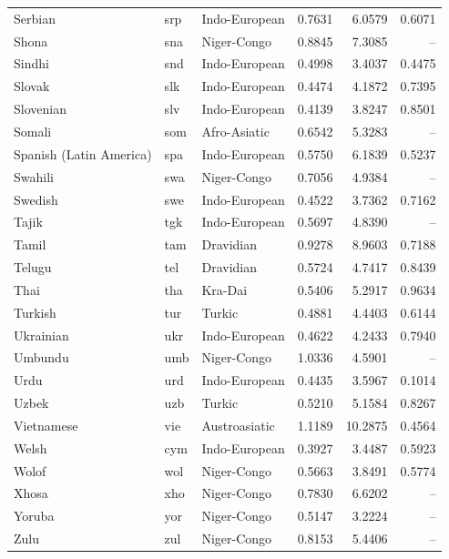 \begin{longtable}{p{3.1cm}p{0.9cm}p{2.7cm}rrr}
Serbian & srp & Indo-European & 0.7631 & 6.0579 & 0.6071\\
Shona & sna & Niger-Congo & 0.8845 & 7.3085 & --\\
Sindhi & snd & Indo-European & 0.4998 & 3.4037 & 0.4475\\
Slovak & slk & Indo-European & 0.4474 & 4.1872 & 0.7395\\
Slovenian & slv & Indo-European & 0.4139 & 3.8247 & 0.8501\\
Somali & som & Afro-Asiatic & 0.6542 & 5.3283 & --\\
Spanish (Latin America) & spa & Indo-European & 0.5750 & 6.1839 & 0.5237\\
Swahili & swa & Niger-Congo & 0.7056 & 4.9384 & --\\
Swedish & swe & Indo-European & 0.4522 & 3.7362 & 0.7162\\
Tajik & tgk & Indo-European & 0.5697 & 4.8390 & --\\
Tamil & tam & Dravidian & 0.9278 & 8.9603 & 0.7188\\
Telugu & tel & Dravidian & 0.5724 & 4.7417 & 0.8439\\
Thai & tha & Kra-Dai & 0.5406 & 5.2917 & 0.9634\\
Turkish & tur & Turkic & 0.4881 & 4.4403 & 0.6144\\
Ukrainian & ukr & Indo-European & 0.4622 & 4.2433 & 0.7940\\
Umbundu & umb & Niger-Congo & 1.0336 & 4.5901 & --\\
Urdu & urd & Indo-European & 0.4435 & 3.5967 & 0.1014\\
Uzbek & uzb & Turkic & 0.5210 & 5.1584 & 0.8267\\
Vietnamese & vie & Austroasiatic & 1.1189 & 10.2875 & 0.4564\\
Welsh & cym & Indo-European & 0.3927 & 3.4487 & 0.5923\\
Wolof & wol & Niger-Congo & 0.5663 & 3.8491 & 0.5774\\
Xhosa & xho & Niger-Congo & 0.7830 & 6.6202 & --\\
Yoruba & yor & Niger-Congo & 0.5147 & 3.2224 & --\\
Zulu & zul & Niger-Congo & 0.8153 & 5.4406 & --\\
\bottomrule\end{longtable}
